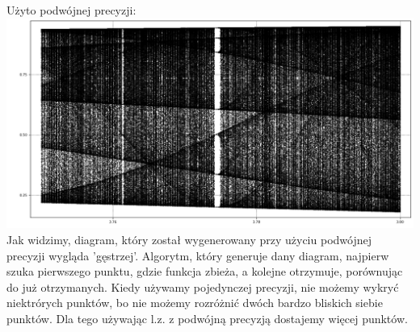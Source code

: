 \documentclass[12pt,a4paper]{article}
\begin{document}
  Użyto podwójnej precyzji: \newline
  \includegraphics[width=1\textwidth]{img/dp} \newline
  Jak widzimy, diagram, który został wygenerowany przy użyciu podwójnej precyzji
  wygląda 'gęstrzej'. Algorytm, który generuje dany diagram, najpierw szuka
  pierwszego punktu, gdzie funkcja zbieża, a kolejne otrzymuje, porównując do
  już otrzymanych. Kiedy używamy pojedynczej precyzji, nie możemy wykryć
  niektrórych punktów, bo nie możemy rozróżnić dwóch bardzo bliskich siebie
  punktów. Dla tego używając l.z. z podwójną precyzją dostajemy więcej punktów.
\end{document}
